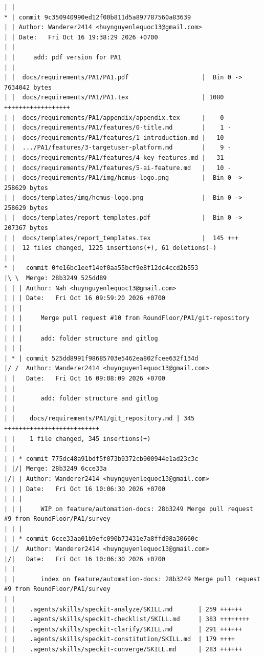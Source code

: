 \documentclass[12pt]{article}
\begin{document}
\begin{lstlisting}[numbers=none,breaklines=true]
| |
* | commit 9c350940990ed12f00b811d5a897787560a83639
| | Author: Wanderer2414 <huynguyenlequoc13@gmail.com>
| | Date:   Fri Oct 16 19:38:29 2026 +0700
| |
| |     add: pdf version for PA1
| |
| |  docs/requirements/PA1/PA1.pdf                    |  Bin 0 -> 7634042 bytes
| |  docs/requirements/PA1/PA1.tex                    | 1080 ++++++++++++++++++
| |  docs/requirements/PA1/appendix/appendix.tex      |    0
| |  docs/requirements/PA1/features/0-title.md        |    1 -
| |  docs/requirements/PA1/features/1-introduction.md |   10 -
| |  .../PA1/features/3-targetuser-platform.md        |    9 -
| |  docs/requirements/PA1/features/4-key-features.md |   31 -
| |  docs/requirements/PA1/features/5-ai-feature.md   |   10 -
| |  docs/requirements/PA1/img/hcmus-logo.png         |  Bin 0 -> 258629 bytes
| |  docs/templates/img/hcmus-logo.png                |  Bin 0 -> 258629 bytes
| |  docs/templates/report_templates.pdf              |  Bin 0 -> 207367 bytes
| |  docs/templates/report_templates.tex              |  145 +++
| |  12 files changed, 1225 insertions(+), 61 deletions(-)
| |
* |   commit 0fe16bc1eef14ef0aa55bcf9e8f12dc4ccd2b553
|\ \  Merge: 28b3249 525dd89
| | | Author: Nah <huynguyenlequoc13@gmail.com>
| | | Date:   Fri Oct 16 09:59:20 2026 +0700
| | |
| | |     Merge pull request #10 from RoundFloor/PA1/git-repository
| | |
| | |     add: folder structure and gitlog
| | |
| * | commit 525dd8991f98685703e5462ea802fcee632f134d
|/ /  Author: Wanderer2414 <huynguyenlequoc13@gmail.com>
| |   Date:   Fri Oct 16 09:08:09 2026 +0700
| |
| |       add: folder structure and gitlog
| |
| |    docs/requirements/PA1/git_repository.md | 345 ++++++++++++++++++++++++++
| |    1 file changed, 345 insertions(+)
| |
| | * commit 775dc48a91bdf5f073b9372cb900944e1ad23c3c
| |/| Merge: 28b3249 6cce33a
|/| | Author: Wanderer2414 <huynguyenlequoc13@gmail.com>
| | | Date:   Fri Oct 16 10:06:30 2026 +0700
| | |
| | |     WIP on feature/automation-docs: 28b3249 Merge pull request #9 from RoundFloor/PA1/survey
| | |
| | * commit 6cce33aa01b9efc090b73431e7a8ffd98a30660c
| |/  Author: Wanderer2414 <huynguyenlequoc13@gmail.com>
|/|   Date:   Fri Oct 16 10:06:30 2026 +0700
| |
| |       index on feature/automation-docs: 28b3249 Merge pull request #9 from RoundFloor/PA1/survey
| |
| |    .agents/skills/speckit-analyze/SKILL.md       | 259 ++++++
| |    .agents/skills/speckit-checklist/SKILL.md     | 383 ++++++++
| |    .agents/skills/speckit-clarify/SKILL.md       | 291 ++++++
| |    .agents/skills/speckit-constitution/SKILL.md  | 179 ++++
| |    .agents/skills/speckit-converge/SKILL.md      | 283 ++++++

\end{lstlisting}
\end{document}
